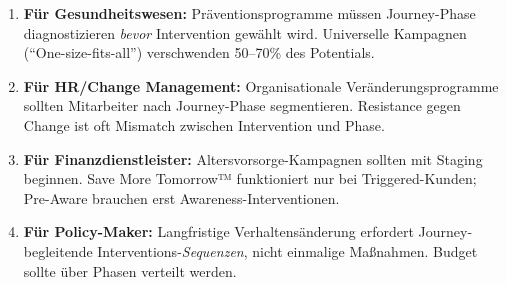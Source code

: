 \begin{enumerate}
\item \textbf{Für Gesundheitswesen:} Präventionsprogramme müssen Journey-Phase diagnostizieren \textit{bevor} Intervention gewählt wird. Universelle Kampagnen (``One-size-fits-all'') verschwenden 50--70\% des Potentials.

\item \textbf{Für HR/Change Management:} Organisationale Veränderungsprogramme sollten Mitarbeiter nach Journey-Phase segmentieren. Resistance gegen Change ist oft Mismatch zwischen Intervention und Phase.

\item \textbf{Für Finanzdienstleister:} Altersvorsorge-Kampagnen sollten mit Staging beginnen. Save More Tomorrow™ funktioniert nur bei Triggered-Kunden; Pre-Aware brauchen erst Awareness-Interventionen.

\item \textbf{Für Policy-Maker:} Langfristige Verhaltensänderung erfordert Journey-begleitende Interventions-\textit{Sequenzen}, nicht einmalige Maßnahmen. Budget sollte über Phasen verteilt werden.
\end{enumerate}


